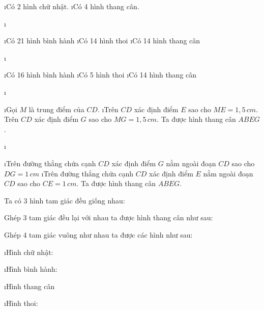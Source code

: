 \begin{Answer}{80}
		\begin{enumerate}[--, leftmargin=*]
			\i Có 2 hình chữ nhật.
			\i Có 4 hình thang cân.
		\end{enumerate}
	
\end{Answer}
\begin{Answer}{81}
		\begin{enumerate}[a), leftmargin=*]
			\i \begin{enumerate}[--, leftmargin=*]
				\i Có 21 hình bình hành
				\i Có 14 hình thoi
				\i Có 14 hình thang cân
				\end{enumerate}
			\i \begin{enumerate}[--, leftmargin=*]
				\i Có 16 hình bình hành
				\i Có 5 hình thoi
				\i Có 14 hình thang cân
			\end{enumerate}
		\end{enumerate}
	
\end{Answer}
\begin{Answer}{82}
		\begin{enumerate}[a), leftmargin=*]
			\i \begin{enumerate}[Bước 1:, leftmargin=*]
				\i Gọi $M$ là trung điểm của  $CD$.
				\i Trên $CD$ xác định điểm $E$ sao cho $ME = 1,5\,cm$. Trên $CD$ xác định điểm $G$  sao cho $MG = 1,5\, cm$.  Ta được hình thang cân $ABEG$.
				\end{enumerate}
			\i \begin{enumerate}[Bước 1:, leftmargin=*]
				\i Trên đường thẳng chứa cạnh $CD$ xác định điểm $G$ nằm ngoài đoạn $CD$ sao cho $DG = 1\,cm$
				\i Trên đường thẳng chứa cạnh $CD$ xác định điểm $E$ nằm ngoài đoạn $CD$ sao cho $CE =1\, cm$. Ta được hình thang cân  $ABEG$.
			\end{enumerate}
		\end{enumerate}
	
\end{Answer}
\begin{Answer}{83}
		Ta có 3 hình tam giác đều giống nhau:
		
		
		Ghép 3 tam giác đều lại với nhau ta được hình thang cân như sau:
		
	
\end{Answer}
\begin{Answer}{84}
		Ghép 4 tam giác vuông như nhau ta được các hình như sau:
		\begin{enumerate}[a), leftmargin=*]
			\i Hình chữ nhật:
			
			\i Hình bình hành:
			
			\i Hình thang cân
			
			\i Hình thoi:
		\end{enumerate}
		
	
\end{Answer}
